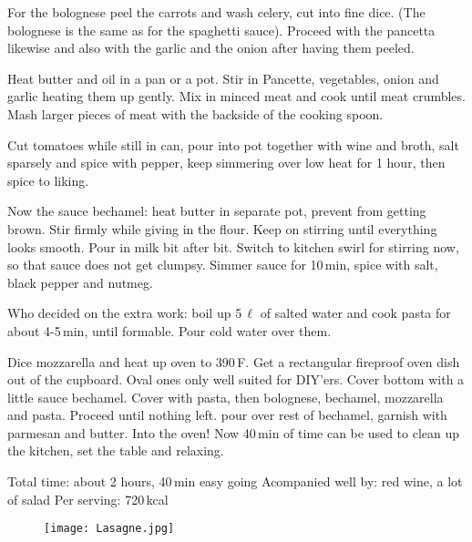 \begin{Notes}
  \item For the bolognese peel the carrots and wash celery, cut into fine
    dice. (The bolognese is the same as for the spaghetti sauce). Proceed with
    the pancetta likewise and also with the garlic and the onion after having
    them peeled.
    
  \item Heat butter and oil in a pan or a pot. Stir in Pancette, vegetables,
    onion and garlic heating them up gently. Mix in minced meat and cook until
    meat crumbles. Mash larger pieces of meat with the backside of the cooking
    spoon.
  \item Cut tomatoes while still in can, pour into pot together with wine and
    broth, salt sparsely and spice with pepper, keep simmering over low heat
    for 1 hour, then spice to liking.

  \item Now the sauce bechamel: heat butter in separate pot, prevent from
    getting brown. Stir firmly while giving in the flour. Keep on stirring until
    everything looks smooth. Pour in milk bit after bit. Switch to kitchen swirl
    for stirring now, so that sauce does not get clumpsy. Simmer sauce for
    10\,min, spice with salt, black pepper and nutmeg.
  \item Who decided on the extra work: boil up 5\,$\ell$ of salted water and
    cook pasta for about 4-5\,min, until formable. Pour cold water over them.


  \item Dice mozzarella and heat up oven to 390\textdegree\,F. Get a rectangular
    fireproof oven dish out of the cupboard. Oval ones only well suited for
    DIY'ers. Cover bottom with a little sauce
    bechamel. Cover with pasta, then bolognese, bechamel, mozzarella and pasta.
    Proceed until nothing left. pour over rest of bechamel, garnish with
    parmesan and butter. Into the oven! Now 40\,min of time can be used to clean
    up the kitchen, set the table and relaxing.

\end{Notes}
Total time: about 2 hours, 40\,min easy going \newline
Acompanied well by: red wine, a lot of salad
Per serving: 720\,kcal
\vfill
\begin{figure}[H]
  \centering
  \texttt{[image: Lasagne.jpg]}
\end{figure}
\newpage

